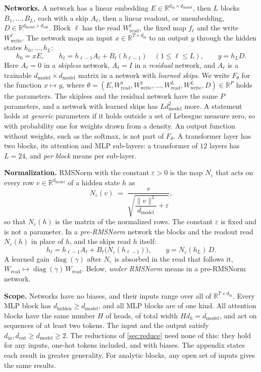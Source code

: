 \documentclass[10pt]{article}
\theoremstyle{definition}
\theoremstyle{remark}
\newcommand{\R}{\mathbb{R}}
\newcommand{\Wread}{W_{\mathrm{read}}}
\newcommand{\Wwrite}{W_{\mathrm{write}}}
\newcommand{\dm}{d_{\mathrm{model}}}
\newcommand{\dhid}{d_{\mathrm{hidden}}}
\newcommand{\norm}[1]{\lVert #1\rVert}
\newcommand{\para}[1]{\smallskip\noindent\textbf{#1}\hspace{0.5em}}
\begin{document}
\para{Networks.} A network has a linear embedding $E \in \R^{d_{\mathrm{in}}\times\dm}$, then $L$ blocks $B_1, \dots, B_L$, each with a skip $A_\ell$, then a linear readout, or unembedding, $D \in \R^{\dm\times d_{\mathrm{out}}}$. Block $\ell$ has the read $\Wread^{\ell}$, the fixed map $f_\ell$ and the write $\Wwrite^{\ell}$. The network maps an input $x \in \R^{T\times d_{\mathrm{in}}}$ to an output $y$ through the hidden states $h_0, \dots, h_L$:
\begin{equation}\label{eq:nets}
h_0 = xE, \qquad h_\ell = h_{\ell-1}A_\ell + B_\ell(h_{\ell-1}) \quad (1 \le \ell \le L), \qquad y = h_LD.
\end{equation}
Here $A_\ell = 0$ in a \emph{skipless} network, $A_\ell = I$ in a \emph{residual} network, and $A_\ell$ is a trainable $\dm\times\dm$ matrix in a network with \emph{learned skips}. We write $F_\theta$ for the function $x \mapsto y$, where $\theta = (E, \Wread^{1}, \Wwrite^{1}, \dots, \Wread^{L}, \Wwrite^{L}, D) \in \R^P$ holds the parameters. The skipless and the residual network have the same $P$ parameters, and a network with learned skips has $L\dm^2$ more. A statement holds at \emph{generic} parameters if it holds outside a set of Lebesgue measure zero, so with probability one for weights drawn from a density. An output function without weights, such as the softmax, is not part of $F_\theta$. A transformer layer has two blocks, its attention and MLP sub-layers: a transformer of $12$ layers has $L = 24$, and \emph{per block} means per sub-layer.

\para{Normalization.} RMSNorm with the constant $\varepsilon > 0$ is the map $N_\varepsilon$ that acts on every row $v \in \R^{\dm}$ of a hidden state $h$ as
\[
N_\varepsilon(v) \;=\; \frac{v}{\sqrt{\dfrac{\norm{v}^2}{\dm} + \varepsilon}} ,
\]
so that $N_\varepsilon(h)$ is the matrix of the normalized rows. The constant $\varepsilon$ is fixed and is not a parameter. In a \emph{pre-RMSNorm} network the blocks and the readout read $N_\varepsilon(h)$ in place of $h$, and the skips read $h$ itself:
\begin{equation}\label{eq:prenorm}
h_\ell = h_{\ell-1}A_\ell + B_\ell\big(N_\varepsilon(h_{\ell-1})\big), \qquad y = N_\varepsilon(h_L)\,D.
\end{equation}
A learned gain $\operatorname{diag}(\gamma)$ after $N_\varepsilon$ is absorbed in the read that follows it, $\Wread \mapsto \operatorname{diag}(\gamma)\,\Wread$. Below, \emph{under RMSNorm} means in a pre-RMSNorm network.

\para{Scope.} Networks have no biases, and their inputs range over all of $\R^{T\times d_{\mathrm{in}}}$. Every MLP block has $\dhid \ge \dm$, and all MLP blocks are of one kind. All attention blocks have the same number $H$ of heads, of total width $Hd_h = \dm$, and act on sequences of at least two tokens. The input and the output satisfy $d_{\mathrm{in}}, d_{\mathrm{out}} \ge \dm \ge 2$. The reductions of \cref{sec:reduce} need none of this: they hold for any inputs, one-hot tokens included, and with biases. The appendix states each result in greater generality. For analytic blocks, any open set of inputs gives the same results.
\end{document}
